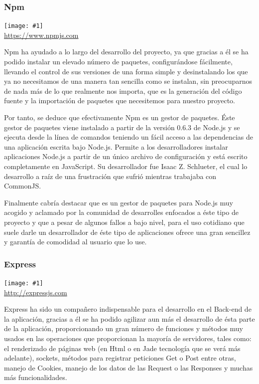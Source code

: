 \documentclass[11pt,openany]{book}
\newcommand{\logo}[2]{\medskip\begin{center}\texttt{[image: \#1]}\\\scriptsize\url{#2}\end{center}\bigskip}
\begin{document}
\subsubsection{Npm}

\logo{logos/npm.png}{https://www.npmjs.com}

Npm ha ayudado a lo largo del desarrollo del proyecto, ya que gracias a él se ha podido instalar un elevado número de paquetes, configurándose fácilmente, llevando el control de sus versiones de una forma simple y desinstalando los que ya no necesitamos de una manera tan sencilla como se instalan, sin preocuparnos de nada más de lo que realmente nos importa, que es la generación del código fuente y la importación de paquetes que necesitemos para nuestro proyecto.

Por tanto, se deduce que efectivamente Npm es un gestor de paquetes. Éste gestor de paquetes viene instalado a partir de la versión 0.6.3 de Node.js y se ejecuta desde la línea de comandos teniendo un fácil acceso a las dependencias de una aplicación escrita bajo Node.js. Permite a los desarrolladores instalar aplicaciones Node.js a partir de un único archivo de configuración y está escrito completamente en JavaScript. Su desarrollador fue Isaac Z. Schlueter, el cual lo desarrollo a raíz de una frustración que sufrió mientras trabajaba con CommonJS.

Finalmente cabría destacar que es un gestor de paquetes para Node.js muy acogido y aclamado por la comunidad de desarrolles enfocados a éste tipo de proyecto y que a pesar de algunos fallos a bajo nivel, para el uso cotidiano que suele darle un desarrollador de éste tipo de aplicaciones ofrece una gran sencillez y garantía de comodidad al usuario que lo use.

\subsubsection{Express}

\logo{logos/express.png}{http://expressjs.com}

Express ha sido un compañero indispensable para el desarrollo en el Back-end de la aplicación, gracias a él se ha podido agilizar aun más el desarrollo de ésta parte de la aplicación, proporcionando un gran número de funciones y métodos muy usados en las operaciones que proporcionan la mayoría de servidores, tales como: el renderizado de páginas web (en Html o en Jade tecnología que se verá más adelante), sockets, métodos para registrar peticiones Get o Post entre otras, manejo de Cookies, manejo de los datos de las Request o las Responses y muchas más funcionalidades.
\end{document}
